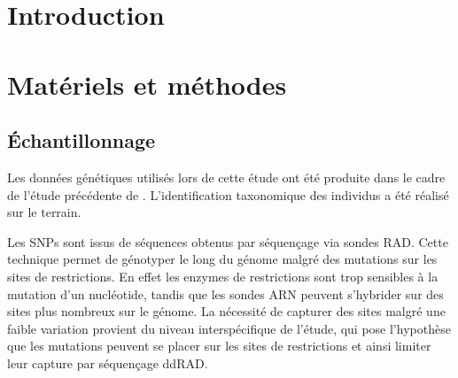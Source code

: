 \documentclass[12pt,a4paper,notitlepage]{article}
\begin{document}


\section{Introduction}

\lipsum[1-2]


%
\section{Matériels et méthodes}

\subsection{Échantillonnage}

Les données génétiques utilisés lors de cette étude ont été produite dans le cadre de l'étude précédente de \citet{Boucher2016a}. L'identification taxonomique des individus a été réalisé sur le terrain.

Les SNPs sont issus de séquences obtenus par séquençage via sondes RAD. Cette technique permet de génotyper le long du génome malgré des mutations sur les sites de restrictions. En effet les enzymes de restrictions sont trop sensibles à la mutation d'un nucléotide, tandis que les sondes ARN peuvent s'hybrider sur des sites plus nombreux sur le génome. La nécessité de capturer des sites malgré une faible variation provient du niveau interspécifique de l'étude, qui pose l'hypothèse que les mutations peuvent se placer sur les sites de restrictions et ainsi limiter leur capture par séquençage ddRAD.
\end{document}
